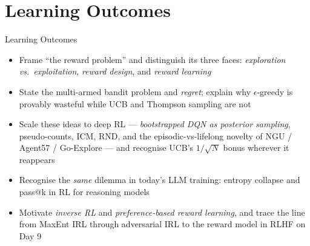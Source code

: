 \section{Learning Outcomes}
\begin{frame}{Learning Outcomes}
    \begin{itemize}
        \setlength{\itemsep}{0.7em}
        \item Frame ``the reward problem'' and distinguish its three faces:
              \emph{exploration vs.\ exploitation}, \emph{reward design}, and \emph{reward learning}
        \item State the multi-armed bandit problem and \emph{regret}; explain why
              $\epsilon$-greedy is provably wasteful while UCB and Thompson sampling are not
        \item Scale these ideas to deep RL --- \emph{bootstrapped DQN as posterior
              sampling}, pseudo-counts, ICM, RND, and the episodic-vs-lifelong novelty of
              NGU / Agent57 / Go-Explore --- and recognise UCB's $1/\sqrt{N}$ bonus wherever it reappears
        \item Recognise the \emph{same} dilemma in today's LLM training: entropy collapse
              and pass@k in RL for reasoning models
        \item Motivate \emph{inverse RL} and \emph{preference-based reward learning}, and
              trace the line from MaxEnt IRL through adversarial IRL to the reward model
              in RLHF on Day 9
    \end{itemize}
\end{frame}
